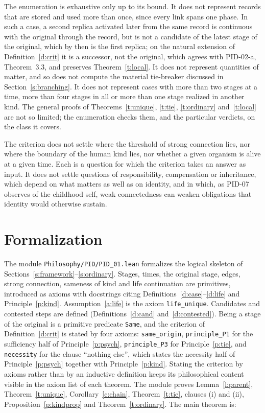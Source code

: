 \documentclass{situationist-preprint}
\begin{document}
The enumeration is exhaustive only up to its bound. It does not represent records that are stored and used more than once, since every link spans one phase. In such a case, a second replica activated later from the same record is continuous with the original through the record, but is not a candidate of the latest stage of the original, which by then is the first replica; on the natural extension of Definition~\ref{d:crit} it is a successor, not the original, which agrees with PID-02-a, Theorem~3.3, and preserves Theorem~\ref{t:local}. It does not represent quantities of matter, and so does not compute the material tie-breaker discussed in Section~\ref{s:branching}. It does not represent cases with more than two stages at a time, more than four stages in all or more than one stage realized in another kind. The general proofs of Theorems~\ref{t:unique}, \ref{t:tie}, \ref{t:ordinary} and~\ref{t:local} are not so limited; the enumeration checks them, and the particular verdicts, on the class it covers.

The criterion does not settle where the threshold of strong connection lies, nor where the boundary of the human kind lies, nor whether a given organism is alive at a given time. Each is a question for which the criterion takes an answer as input. It does not settle questions of responsibility, compensation or inheritance, which depend on what matters as well as on identity, and in which, as PID-07 observes of the childhood self, weak connectedness can weaken obligations that identity would otherwise sustain.

\section{Formalization}\label{s:formal}

The module \nolinkurl{Philosophy/PID/PID_01.lean} formalizes the logical skeleton of Sections~\ref{s:framework}--\ref{s:ordinary}. Stages, times, the original stage, edges, strong connection, sameness of kind and life continuation are primitives, introduced as axioms with docstrings citing Definitions~\ref{d:case}--\ref{d:life} and Principle~\ref{p:kind}. Assumption~\ref{a:life} is the axiom \texttt{life\_unique}. Candidates and contested steps are defined (Definitions~\ref{d:cand} and~\ref{d:contested}). Being a stage of the original is a primitive predicate \texttt{Same}, and the criterion of Definition~\ref{d:crit} is stated by four axioms: \texttt{same\_origin}, \texttt{principle\_P1} for the sufficiency half of Principle~\ref{p:psych}, \texttt{principle\_P3} for Principle~\ref{p:tie}, and \texttt{necessity} for the clause \enquote{nothing else}, which states the necessity half of Principle~\ref{p:psych} together with Principle~\ref{p:kind}. Stating the criterion by axioms rather than by an inductive definition keeps its philosophical content visible in the axiom list of each theorem. The module proves Lemma~\ref{l:parent}, Theorem~\ref{t:unique}, Corollary~\ref{c:chain}, Theorem~\ref{t:tie}, clauses (i) and (ii), Proposition~\ref{p:kindprop} and Theorem~\ref{t:ordinary}. The main theorem is:
\end{document}
